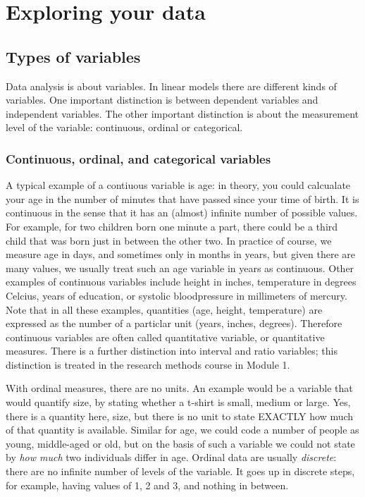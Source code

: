 \chapter{Exploring your data}

\section{Types of variables}
Data analysis is about variables. In linear models there are different kinds of variables. One important distinction is between dependent variables and independent variables. The other important distinction is about the measurement level of the variable: continuous, ordinal or categorical. 


\subsection{Continuous, ordinal, and categorical variables}
A typical example of a contiuous variable is age: in theory, you could calcualate your age in the number of minutes that have passed since your time of birth. It is continuous in the sense that it has an (almost) infinite number of possible values. For example, for two children born one minute a part, there could be a third child that was born just in between the other two. In practice of course, we measure age in days, and sometimes only in months in years, but given there are many values, we usually treat such an age variable in years as continuous. Other examples of continuous variables include height in inches, temperature in degrees Celcius, years of education, or systolic bloodpressure in millimeters of mercury. Note that in all these examples, quantities (age, height, temperature) are expressed as the number of a particlar unit (years, inches, degrees). Therefore continuous variables are often called quantitative variable, or quantitative measures. There is a further distinction into interval and ratio variables; this distinction is treated in the research methods course in Module 1.

With ordinal measures, there are no units. An example would be a variable that would quantify size, by stating whether a t-shirt is small, medium or large. Yes, there is a quantity here, size, but there is no unit to state EXACTLY how much of that quantity is available. Similar for age, we could code a number of people as young, middle-aged or old, but on the basis of such a variable we could not state by \textit{how much} two individuals differ in age. Ordinal data are usually \textit{discrete}: there are no infinite number of levels of the variable. It goes up in discrete steps, for example, having values of 1, 2 and 3, and nothing in between.


